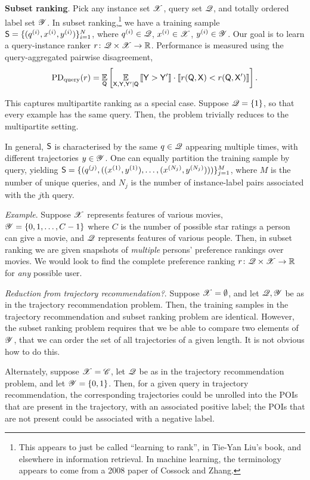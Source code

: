 %
\textbf{Subset ranking}.
Pick any instance set $\mathscr{X}$,
query set $\mathscr{Q}$,
and totally ordered label set $\mathscr{Y}$.
In subset ranking,\footnote{This appears to just be called ``learning to rank'', \eg in Tie-Yan Liu's book, and elsewhere in information retrieval. In machine learning, the terminology appears to come from a 2008 paper of Cossock and Zhang.}
we have a training sample $\mathsf{S} = \{ ( q^{(i)}, x^{(i)}, y^{(i)} ) \}_{i = 1}^N$,
where
$q^{(i)} \in \mathscr{Q}$,
$x^{(i)} \in \mathscr{X}$,
$y^{(i)} \in \mathscr{Y}$.
Our goal is to learn a query-instance ranker $r \colon \mathscr{Q} \times \mathscr{X} \to \mathbb{R}$.
Performance is measured using the
query-aggregated
pairwise disagreement,
$$ \mathrm{PD}_{\mathrm{query}}( r ) = \underset{\mathsf{Q}}{\mathbb{E}}\left[  \underset{\mathsf{X}, \mathsf{Y}, \mathsf{Y}' \mid \mathsf{Q}}{\mathbb{E}}\,  \llbracket  \mathsf{Y} > \mathsf{Y}'  \rrbracket \cdot \llbracket  r( \mathsf{Q}, \mathsf{X} ) < r( \mathsf{Q}, \mathsf{X}' )  \rrbracket  \right]. $$

This captures multipartite ranking as a special case.
Suppose $\mathscr{Q} = \{ 1 \}$, so that every example has the same query.
Then, the problem trivially reduces to the multipartite setting.

In general, $\mathsf{S}$ is characterised by the same $q \in \mathscr{Q}$ appearing multiple times, with different trajectories $y \in \mathscr{Y}$.
One can equally partition the training sample by query, yielding
$ \mathsf{S} = \{ ( q^{(j)}, ( ( x^{(1)}, y^{(1)} ), \ldots, ( x^{(N_j)}, y^{(N_j)} ) ) ) \}_{j = 1}^{M} $,
where $M$ is the number of unique queries,
and $N_j$ is the number of instance-label pairs associated with the $j$th query.

\emph{Example}.
Suppose $\mathscr{X}$ represents features of various movies, $\mathscr{Y} = \{ 0, 1, \ldots, C - 1 \}$ where $C$ is the number of possible star ratings a person can give a movie,
and $\mathscr{Q}$ represents features of various people.
Then, in subset ranking we are given snapshots of \emph{multiple} persons' preference rankings over movies.
We would look to find the complete preference ranking $r \colon \mathscr{Q} \times \mathscr{X} \to \mathbb{R}$ for \emph{any} possible user.

\emph{Reduction from trajectory recommendation?}.
Suppose $\mathscr{X} = \emptyset$,
and let $\mathscr{Q}, \mathscr{Y}$ be as in the trajectory recommendation problem.
Then, the training samples in the trajectory recommendation and subset ranking problem are identical.
However, the subset ranking problem requires that we be able to compare two elements of $\mathscr{Y}$, \ie that we can order the set of all trajectories of a given length.
It is not obvious how to do this.

Alternately, suppose $\mathscr{X} = \mathscr{C}$,
let $\mathscr{Q}$ be as in the trajectory recommendation problem,
and let $\mathscr{Y} = \{ 0, 1 \}$.
Then, for a given query in trajectory recommendation,
the corresponding trajectories could be unrolled into the POIs that are present in the trajectory, with an associated positive label;
the POIs that are not present could be associated with a negative label.

